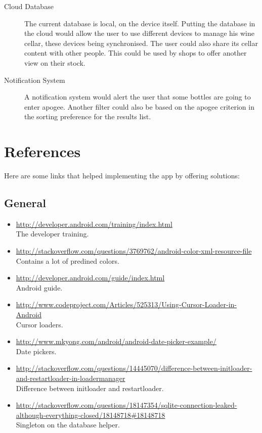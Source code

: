 \begin{description}
	\item[Cloud Database] The current database is local, on the device itself. Putting the database in the cloud would allow the user to use different devices to manage his wine cellar, these devices being synchronised. The user could also share its cellar content with other people. This could be used by shops to offer another view on their stock.
	
	\item[Notification System] A notification system would alert the user that some bottles are going to enter apogee. Another filter could also be based on the apogee criterion in the sorting preference for the results list.
\end{description}


\section{References}
\label{references}

Here are some links that helped implementing the app by offering solutions:

\subsection{General}

\begin{itemize}
	\item \url{http://developer.android.com/training/index.html} \\The developer training.
	\item \url{http://stackoverflow.com/questions/3769762/android-color-xml-resource-file} \\Contains a lot of predined colors.
	\item \url{http://developer.android.com/guide/index.html} \\Android guide.
	\item \url{http://www.codeproject.com/Articles/525313/Using-Cursor-Loader-in-Android} \\Cursor loaders.
	\item \url{http://www.mkyong.com/android/android-date-picker-example/} \\Date pickers.
	\item \url{http://stackoverflow.com/questions/14445070/difference-between-initloader-and-restartloader-in-loadermanager} \\Difference between initloader and restartloader.
	\item \url{http://stackoverflow.com/questions/18147354/sqlite-connection-leaked-although-everything-closed/18148718#18148718} \\Singleton on the database helper.
\end{itemize}


